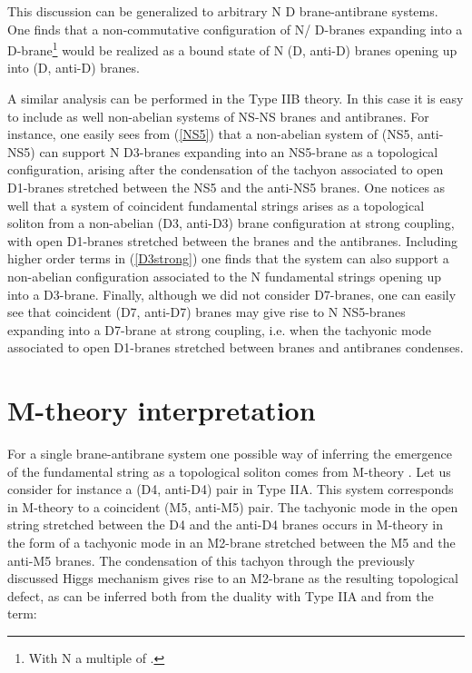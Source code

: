 \documentclass[12pt,a4paper]{article}
\begin{document}
This discussion can be generalized to arbitrary N D\coordHE{}
brane-antibrane systems. One finds that a non-commutative
configuration of N/\coordHE{} D\coordHE{}-branes expanding into
a D\coordHE{}-brane\footnote{With N a multiple of \coordHE{}.}
would be realized as a bound state of
N (D\coordHE{}, anti-D\coordHE{}) branes opening up into \coordHE{}
(D\coordHE{}, anti-D\coordHE{}) branes.

A similar analysis can be performed in the Type IIB theory.
In this case it is easy to include as well non-abelian systems of 
NS-NS branes and antibranes. For instance, one easily sees from
(\ref{NS5}) that a non-abelian system of (NS5, anti-NS5) can
support N D3-branes expanding into an NS5-brane as a topological
configuration, arising after the condensation of the tachyon associated
to open D1-branes stretched between the NS5 and the anti-NS5 branes.
One notices as well that a system of coincident fundamental strings
arises as a topological soliton from a non-abelian (D3, anti-D3) brane
configuration at strong coupling, 
with open D1-branes stretched between the branes and the antibranes.
Including higher order terms in (\ref{D3strong}) one finds that
the system can also support a non-abelian configuration associated
to the N fundamental strings opening up into a D3-brane.  
Finally, although we did not consider D7-branes, one can easily
see that coincident (D7, anti-D7) branes may give rise to N
NS5-branes expanding into a D7-brane at strong coupling, i.e. when
the tachyonic mode associated to open D1-branes stretched between
branes and antibranes condenses. 


\section{M-theory interpretation}

For a single brane-antibrane system one possible way of inferring 
the emergence of the fundamental string as a topological soliton
comes from M-theory \cite{Yi,HL1}. Let us consider for instance
a (D4, anti-D4) pair in Type IIA. This system corresponds in M-theory
to a coincident (M5, anti-M5) pair. 
The tachyonic mode in the
open string stretched between the D4 and the anti-D4 branes occurs
in M-theory in the form of a tachyonic mode in an M2-brane stretched 
between the M5 and the anti-M5 branes.
The condensation of this tachyon through the previously discussed
Higgs mechanism
gives rise to an
M2-brane as the resulting topological defect, as can be inferred both
from the duality with Type IIA and from the term:
\end{document}
